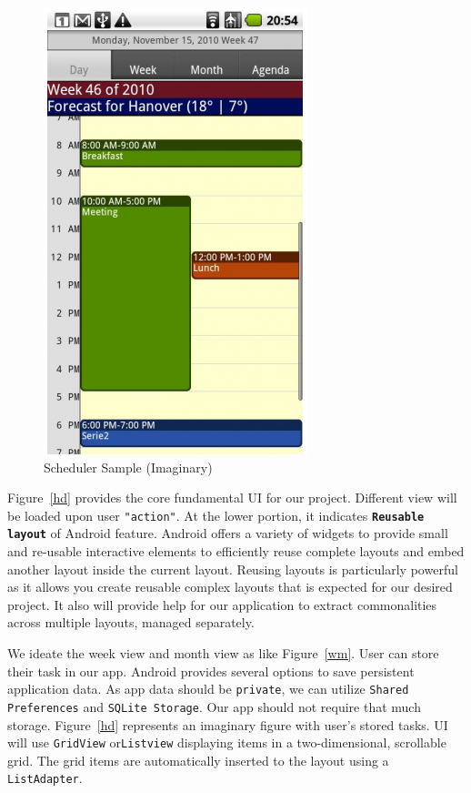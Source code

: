 \documentclass[10pt,a4paper]{report}
\begin{document}
\begin{figure}[h!]
\begin{center}
	\includegraphics[scale=0.7, trim=125 0 50 0]{dvc.png}
	\caption{Scheduler Sample (Imaginary)}
\end{center}
\label{dvc}
\end{figure}



Figure~\ref{hd} provides the core fundamental UI for our project. Different view will be loaded upon user \texttt{"action"}. At the lower portion, it indicates \texttt{\textbf{Reusable layout}}  of Android feature. Android offers a variety of widgets to provide small and re-usable interactive elements to efficiently reuse complete layouts and embed another layout inside the current layout. Reusing layouts is particularly powerful as it allows you create reusable complex layouts that is expected for our desired project. It also will provide help for our application to extract commonalities across multiple layouts, managed separately. 

We ideate the week view and month view as like Figure~\ref{wm}. User can store their task in our app. Android provides several options to save persistent application data. As app data should be \texttt{private}, we can utilize \texttt{Shared Preferences} and \texttt{SQLite Storage}. Our app should not require that much storage. Figure~\ref{hd} represents an imaginary figure with user's stored tasks. UI will use \texttt{GridView}  or\texttt{Listview} displaying items in a two-dimensional, scrollable grid. The grid items are automatically inserted to the layout using a \texttt{ListAdapter}.
\end{document}
